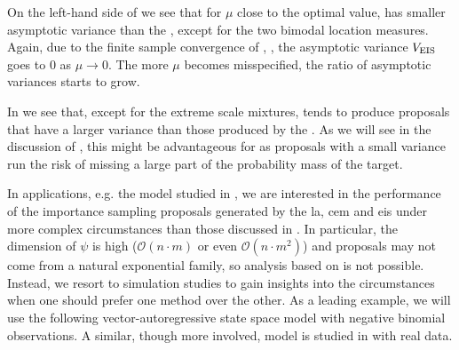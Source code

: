 On the left-hand side of  we see that for $\mu$ close to the optimal value, \aeis has smaller asymptotic variance than the \acem, except for the two bimodal location measures. Again, due to the finite sample convergence of \aeis, , the asymptotic variance $V_{{\text{EIS}}}$ goes to $0$ as $\mu \to 0$. The more $\mu$ becomes misspecified, the ratio of asymptotic variances starts to grow. 

In  we see that, except for the extreme scale mixtures, \aeis tends to produce proposals that have a larger variance than those produced by the \acem. As we will see in the discussion of , this might be advantageous for \aeis as proposals with a small variance run the risk of missing a large part of the probability mass of the target. 

In applications, e.g. the model studied in , we are interested in the performance of the importance sampling proposals generated by the \gls{la}, \gls{cem} and \gls{eis} under more complex circumstances than those discussed in . In particular, the dimension of $\psi$ is high ($\mathcal O(n \cdot m)$ or even $\mathcal O(n \cdot m^{2})$) and proposals may not come from a natural exponential family, so analysis based on  is not possible.  Instead, we resort to simulation studies to gain insights into the circumstances when one should prefer one method over the other.
As a leading example, we will use the following vector-autoregressive state space model with negative binomial observations. A similar, though more involved, model is studied in  with real data.

